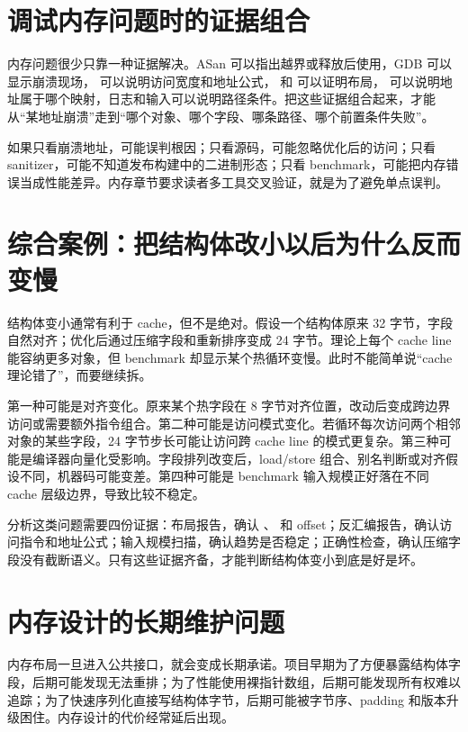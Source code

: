 \section{调试内存问题时的证据组合}

内存问题很少只靠一种证据解决。ASan 可以指出越界或释放后使用，GDB 可以显示崩溃现场， 可以说明访问宽度和地址公式， 和  可以证明布局， 可以说明地址属于哪个映射，日志和输入可以说明路径条件。把这些证据组合起来，才能从“某地址崩溃”走到“哪个对象、哪个字段、哪条路径、哪个前置条件失败”。

如果只看崩溃地址，可能误判根因；只看源码，可能忽略优化后的访问；只看 sanitizer，可能不知道发布构建中的二进制形态；只看 benchmark，可能把内存错误当成性能差异。内存章节要求读者多工具交叉验证，就是为了避免单点误判。

\section{综合案例：把结构体改小以后为什么反而变慢}

结构体变小通常有利于 cache，但不是绝对。假设一个结构体原来 32 字节，字段自然对齐；优化后通过压缩字段和重新排序变成 24 字节。理论上每个 cache line 能容纳更多对象，但 benchmark 却显示某个热循环变慢。此时不能简单说“cache 理论错了”，而要继续拆。

第一种可能是对齐变化。原来某个热字段在 8 字节对齐位置，改动后变成跨边界访问或需要额外指令组合。第二种可能是访问模式变化。若循环每次访问两个相邻对象的某些字段，24 字节步长可能让访问跨 cache line 的模式更复杂。第三种可能是编译器向量化受影响。字段排列改变后，load/store 组合、别名判断或对齐假设不同，机器码可能变差。第四种可能是 benchmark 输入规模正好落在不同 cache 层级边界，导致比较不稳定。

分析这类问题需要四份证据：布局报告，确认 、 和 offset；反汇编报告，确认访问指令和地址公式；输入规模扫描，确认趋势是否稳定；正确性检查，确认压缩字段没有截断语义。只有这些证据齐备，才能判断结构体变小到底是好是坏。

\section{内存设计的长期维护问题}

内存布局一旦进入公共接口，就会变成长期承诺。项目早期为了方便暴露结构体字段，后期可能发现无法重排；为了性能使用裸指针数组，后期可能发现所有权难以追踪；为了快速序列化直接写结构体字节，后期可能被字节序、padding 和版本升级困住。内存设计的代价经常延后出现。

